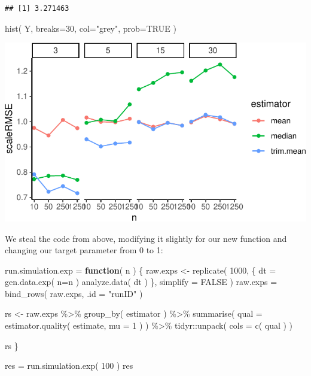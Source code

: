 \documentclass[
]{book}
\newenvironment{Shaded}{\begin{snugshade}}{\end{snugshade}}
\newcommand{\AttributeTok}[1]{\textcolor[rgb]{0.77,0.63,0.00}{#1}}
\newcommand{\ConstantTok}[1]{\textcolor[rgb]{0.00,0.00,0.00}{#1}}
\newcommand{\ControlFlowTok}[1]{\textcolor[rgb]{0.13,0.29,0.53}{\textbf{#1}}}
\newcommand{\DecValTok}[1]{\textcolor[rgb]{0.00,0.00,0.81}{#1}}
\newcommand{\FunctionTok}[1]{\textcolor[rgb]{0.00,0.00,0.00}{#1}}
\newcommand{\NormalTok}[1]{#1}
\newcommand{\OtherTok}[1]{\textcolor[rgb]{0.56,0.35,0.01}{#1}}
\newcommand{\SpecialCharTok}[1]{\textcolor[rgb]{0.00,0.00,0.00}{#1}}
\newcommand{\StringTok}[1]{\textcolor[rgb]{0.31,0.60,0.02}{#1}}
\begin{document}
\begin{verbatim}
## [1] 3.271463
\end{verbatim}

\begin{Shaded}
\begin{Highlighting}[]
\FunctionTok{hist}\NormalTok{( Y, }\AttributeTok{breaks=}\DecValTok{30}\NormalTok{, }\AttributeTok{col=}\StringTok{"grey"}\NormalTok{, }\AttributeTok{prob=}\ConstantTok{TRUE}\NormalTok{ )}
\end{Highlighting}
\end{Shaded}

\begin{center}\includegraphics[width=0.75\linewidth]{Designing-Simulations-in-R_files/figure-latex/unnamed-chunk-187-1} \end{center}

We steal the code from above, modifying it slightly for our new function and
changing our target parameter from 0 to 1:

\begin{Shaded}
\begin{Highlighting}[]
\NormalTok{run.simulation.exp }\OtherTok{=} \ControlFlowTok{function}\NormalTok{( n ) \{}
\NormalTok{    raw.exps }\OtherTok{\textless{}{-}} \FunctionTok{replicate}\NormalTok{( }\DecValTok{1000}\NormalTok{, \{}
\NormalTok{        dt }\OtherTok{=} \FunctionTok{gen.data.exp}\NormalTok{( }\AttributeTok{n=}\NormalTok{n )}
        \FunctionTok{analyze.data}\NormalTok{( dt )}
\NormalTok{    \}, }\AttributeTok{simplify =} \ConstantTok{FALSE}\NormalTok{ )}
\NormalTok{    raw.exps }\OtherTok{=} \FunctionTok{bind\_rows}\NormalTok{( raw.exps, }\AttributeTok{.id =} \StringTok{"runID"}\NormalTok{ )}

\NormalTok{    rs }\OtherTok{\textless{}{-}}\NormalTok{ raw.exps }\SpecialCharTok{\%\textgreater{}\%}
        \FunctionTok{group\_by}\NormalTok{( estimator ) }\SpecialCharTok{\%\textgreater{}\%}
        \FunctionTok{summarise}\NormalTok{( }\AttributeTok{qual =} \FunctionTok{estimator.quality}\NormalTok{( estimate, }\AttributeTok{mu =} \DecValTok{1}\NormalTok{ ) ) }\SpecialCharTok{\%\textgreater{}\%}
\NormalTok{        tidyr}\SpecialCharTok{::}\FunctionTok{unpack}\NormalTok{( }\AttributeTok{cols =} \FunctionTok{c}\NormalTok{( qual ) )}

\NormalTok{    rs}
\NormalTok{\}}

\NormalTok{res }\OtherTok{=} \FunctionTok{run.simulation.exp}\NormalTok{( }\DecValTok{100}\NormalTok{ )}
\NormalTok{res}
\end{Highlighting}
\end{Shaded}
\end{document}
